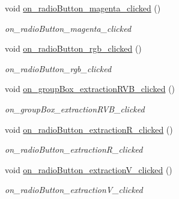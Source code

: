 \begin{DoxyCompactItemize}
void \hyperlink{classMainWindow_ad90a23f641924d6cf4c5f399bdb22c2e}{on\+\_\+radio\+Button\+\_\+magenta\+\_\+clicked} ()
\begin{DoxyCompactList}\small\item\em on\+\_\+radio\+Button\+\_\+magenta\+\_\+clicked \end{DoxyCompactList}\item 
\mbox{\label{classMainWindow_a029c841c8d1452bab969569f3001840a}} 
void \hyperlink{classMainWindow_a029c841c8d1452bab969569f3001840a}{on\+\_\+radio\+Button\+\_\+rgb\+\_\+clicked} ()
\begin{DoxyCompactList}\small\item\em on\+\_\+radio\+Button\+\_\+rgb\+\_\+clicked \end{DoxyCompactList}\item 
\mbox{\label{classMainWindow_a643b2edab2f78bab60c3e3dd5993409e}} 
void \hyperlink{classMainWindow_a643b2edab2f78bab60c3e3dd5993409e}{on\+\_\+group\+Box\+\_\+extraction\+R\+V\+B\+\_\+clicked} ()
\begin{DoxyCompactList}\small\item\em on\+\_\+group\+Box\+\_\+extraction\+R\+V\+B\+\_\+clicked \end{DoxyCompactList}\item 
\mbox{\label{classMainWindow_a70993f7b7d5f3cbd67979813234da83a}} 
void \hyperlink{classMainWindow_a70993f7b7d5f3cbd67979813234da83a}{on\+\_\+radio\+Button\+\_\+extraction\+R\+\_\+clicked} ()
\begin{DoxyCompactList}\small\item\em on\+\_\+radio\+Button\+\_\+extraction\+R\+\_\+clicked \end{DoxyCompactList}\item 
\mbox{\label{classMainWindow_a73f419590c6daf7f3a40fe480c22779a}} 
void \hyperlink{classMainWindow_a73f419590c6daf7f3a40fe480c22779a}{on\+\_\+radio\+Button\+\_\+extraction\+V\+\_\+clicked} ()
\begin{DoxyCompactList}\small\item\em on\+\_\+radio\+Button\+\_\+extraction\+V\+\_\+clicked \end{DoxyCompactList}\item 
\mbox{\label{classMainWindow_a1632f39c370309f84beef1262e176cc0}} 

\end{DoxyCompactItemize}
